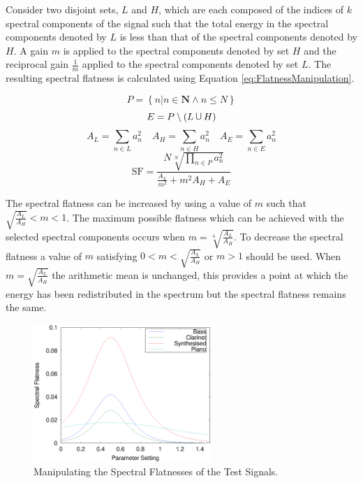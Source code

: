 		Consider two disjoint sets, $L$ and $H$, which are each composed of the indices of $k$ spectral components
		of the signal such that the total energy in the spectral components denoted by $L$ is less than that of the
		spectral components denoted by $H$. A gain $m$ is applied to the spectral components denoted by set $H$ and
		the reciprocal gain $\frac{1}{m}$ applied to the spectral components denoted by set $L$. The resulting
		spectral flatness is calculated using Equation \ref{eq:FlatnessManipulation}.

		\[ P = \left\{ n | n \in \textbf{N} \land n \leq N \right\} \]
		\[ E = P \setminus (L \medcup H) \]
		\[ A_{L} = \sum_{n \in L} a_{n}^{2} \quad A_{H} = \sum_{n \in H} a_{n}^{2}
		   \quad A_{E} = \sum_{n \in E} a_{n}^{2} \]
		\begin{equation}
			\textrm{SF} = \frac{N\sqrt[N]{\prod_{n \in P} a_{n}^{2}}}
			                   {\frac{A_{L}}{m^{2}} + m^{2}A_{H} + A_{E}}
		  	\label{eq:FlatnessManipulation}
		\end{equation}

		The spectral flatness can be increased by using a value of $m$ such that $\sqrt{\frac{A_{L}}{A_{H}}} < m <
		1$. The maximum possible flatness which can be achieved with the selected spectral components occurs when
		$m = \sqrt[4]{\frac{A_{L}}{A_{H}}}$. To decrease the spectral flatness a value of $m$ satisfying $0 <
		m < \sqrt{\frac{A_{L}}{A_{H}}}$ or $m > 1$ should be used. When $m = \sqrt{\frac{A_{L}}{A_{H}}}$ the
		arithmetic mean is unchanged, this provides a point at which the energy has been redistributed in the
		spectrum but the spectral flatness remains the same.

		\begin{figure}[h!]
			\centering
			\includegraphics[width=0.6\textwidth]{chapter6/Images/MoveFlatnesses.eps}
			\caption{Manipulating the Spectral Flatnesses of the Test Signals.}
			\label{fig:MoveFlatnesses}
		\end{figure}

